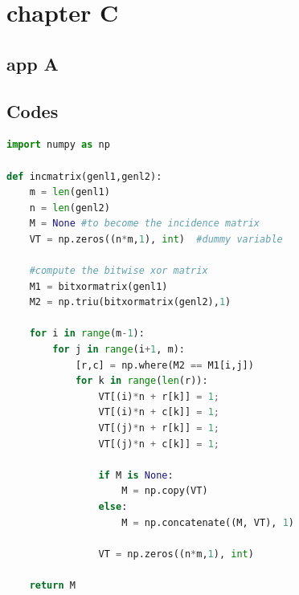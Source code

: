 \appendix
\chapter{chapter C}
\zhlipsum[13]

\section{app A}
\zhlipsum[14-15]

\section{Codes}
\begin{mdframed}
    \begin{lstlisting}[language=Python]
import numpy as np
    
def incmatrix(genl1,genl2):
    m = len(genl1)
    n = len(genl2)
    M = None #to become the incidence matrix
    VT = np.zeros((n*m,1), int)  #dummy variable
    
    #compute the bitwise xor matrix
    M1 = bitxormatrix(genl1)
    M2 = np.triu(bitxormatrix(genl2),1) 

    for i in range(m-1):
        for j in range(i+1, m):
            [r,c] = np.where(M2 == M1[i,j])
            for k in range(len(r)):
                VT[(i)*n + r[k]] = 1;
                VT[(i)*n + c[k]] = 1;
                VT[(j)*n + r[k]] = 1;
                VT[(j)*n + c[k]] = 1;
                
                if M is None:
                    M = np.copy(VT)
                else:
                    M = np.concatenate((M, VT), 1)
                
                VT = np.zeros((n*m,1), int)
    
    return M
\end{lstlisting}
\end{mdframed}


